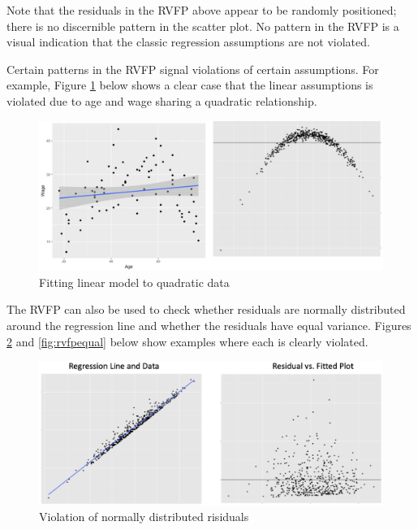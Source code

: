 \documentclass[
]{book}
\begin{document}
Note that the residuals in the RVFP above appear to be randomly positioned; there is no discernible pattern in the scatter plot. No pattern in the RVFP is a visual indication that the classic regression assumptions are not violated.

Certain patterns in the RVFP signal violations of certain assumptions. For example, Figure \ref{fig:rvfplinear} below shows a clear case that the linear assumptions is violated due to age and wage sharing a quadratic relationship.

\begin{figure}

{\centering \includegraphics[width=\textwidth]{images/rvfp_linear} 

}

\caption{Fitting linear model to quadratic data}\label{fig:rvfplinear}
\end{figure}

The RVFP can also be used to check whether residuals are normally distributed around the regression line and whether the residuals have equal variance. Figures \ref{fig:rvfpnormal} and \ref{fig:rvfpequal} below show examples where each is clearly violated.

\begin{figure}

{\centering \includegraphics[width=\textwidth]{images/rvfp_normal} 

}

\caption{Violation of normally distributed risiduals}\label{fig:rvfpnormal}
\end{figure}
\end{document}
